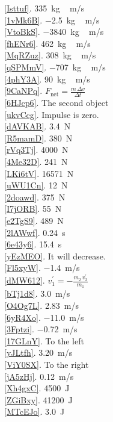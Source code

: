 \documentclass[main.tex]{subfiles}
\begin{document}
\begin{multicols}{2}
\ref{Isttuf}. \SI{335}{kg\,m/s}\\
\ref{1vMk6B}. \SI{-2.5}{kg\,m/s}\\
\ref{VtoBkS}. \SI{-3840}{kg\,m/s}\\
\ref{fhENr6}. \SI{462}{kg\,m/s}\\
\ref{MqRZuz}. \SI{308}{kg\,m/s}\\
\ref{qSPMmV}. \SI{-707}{kg\,m/s}\\
\ref{4phY3A}. \SI{90}{kg\,m/s}\\
\ref{9CaNPq}. $F_{\text{net}} = \frac{m\,\Delta v}{\Delta t}$\\
\ref{6HJcp6}. The second object\\
\ref{ukvCcg}. Impulse is zero.\\
\ref{dAVKAB}. \SI{3.4}{N}\\
\ref{R5mamD}. \SI{380}{N}\\
\ref{rVq3Tj}. \SI{4000}{N}\\
\ref{4Me32D}. \SI{241}{N}\\
\ref{LKi6tV}. \SI{16571}{N}\\
\ref{uWU1Cn}. \SI{12}{N}\\
\ref{2doawd}. \SI{375}{N}\\
\ref{I7jORB}. \SI{55}{N}\\
\ref{e2TgS9}. \SI{489}{N}\\
\ref{2lAWwf}. \SI{0.24}{s}\\
\ref{6e43y6}. \SI{15.4}{s}\\
\ref{yEzMEO}. It will decrease.\\
\ref{Fl5xyW}. \SI{-1.4}{m/s}\\
\ref{dMW612}. $v_1^{\prime} = -\frac{m_2\,v_2^{\prime}}{m_1}$\\
\ref{bTj1d8}. \SI{3.0}{m/s}\\
\ref{O4Og7L}. \SI{2.83}{m/s}\\
\ref{6yR4Xo}. \SI{-11.0}{m/s}\\
\ref{3Fptzi}. \SI{-0.72}{m/s}\\
\ref{17GLnY}. To the left\\
\ref{yJLtfh}. \SI{3.20}{m/s}\\
\ref{ViY0SX}. To the right\\
\ref{jA5zHj}. \SI{0.12}{m/s}\\
\ref{Xh4gxC}. \SI{4500}{J}\\
\ref{ZGiBxy}. \SI{41200}{J}\\
\ref{MTcEJo}. \SI{3.0}{J}\\

\end{multicols}
\end{document}
